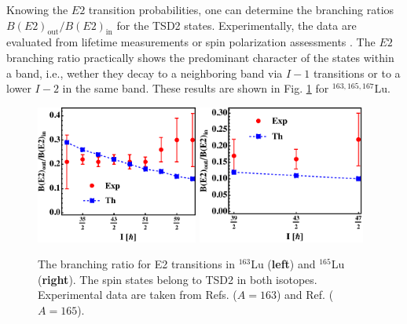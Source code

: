 Knowing the $E2$ transition probabilities, one can determine the branching ratios $B(E2)_\text{out}/B(E2)_\text{in}$ for the TSD2 states. Experimentally, the data are evaluated from lifetime measurements or spin polarization assessments \cite{timar2019experimental,sensharma2021wobbling,lvThesis}. The $E2$ branching ratio practically shows the predominant character of the states within a band, i.e., wether they decay to a neighboring band via $I-1$ transitions or to a lower $I-2$ in the same band. These results are shown in Fig. \ref{figs-BE2-IN-OUT} for $^{163,165,167}$Lu.
\begin{figure}
    \centering
    \includegraphics[width=0.475\textwidth]{Chapters/Figures/BE2inout-1.pdf}
    \includegraphics[width=0.49\textwidth]{Chapters/Figures/BE2inout-2.pdf}
    \caption{The branching ratio for E2 transitions in $^{163}$Lu (\textbf{left}) and $^{165}$Lu (\textbf{right}). The spin states belong to TSD2 in both isotopes. Experimental data are taken from Refs. \cite{hagemann2003wobbling,hamamoto2003nuclear,jensen2002evidence} ($A=163$) and Ref. \cite{schonwasser2003one} ($A=165$).}
    \label{figs-BE2-IN-OUT}
\end{figure}

